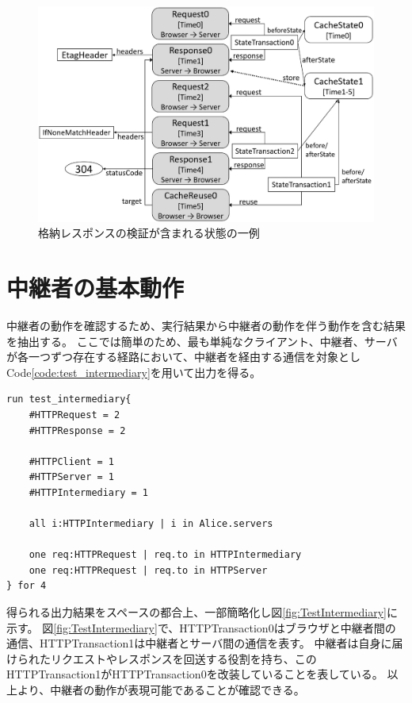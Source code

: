 \documentclass[12pt,a4paper]{jbook}
\begin{document}
\begin{figure}[htb]
\centering
\includegraphics[width=450pt]{./fig/TestVerification.eps}
\caption{格納レスポンスの検証が含まれる状態の一例}
\label{fig:TestVerification}
\end{figure}

\section{中継者の基本動作}
中継者の動作を確認するため、実行結果から中継者の動作を伴う動作を含む結果を抽出する。
ここでは簡単のため、最も単純なクライアント、中継者、サーバが各一つずつ存在する経路において、中継者を経由する通信を対象としCode\ref{code:test_intermediary}を用いて出力を得る。

\begin{lstlisting}[caption=中継者の動作, label=code:test_intermediary]
run test_intermediary{
	#HTTPRequest = 2
	#HTTPResponse = 2

	#HTTPClient = 1
	#HTTPServer = 1
	#HTTPIntermediary = 1

	all i:HTTPIntermediary | i in Alice.servers

	one req:HTTPRequest | req.to in HTTPIntermediary
	one req:HTTPRequest | req.to in HTTPServer
} for 4
\end{lstlisting}

得られる出力結果をスペースの都合上、一部簡略化し図\ref{fig:TestIntermediary}に示す。
図\ref{fig:TestIntermediary}で、HTTPTransaction0はブラウザと中継者間の通信、HTTPTransaction1は中継者とサーバ間の通信を表す。
中継者は自身に届けられたリクエストやレスポンスを回送する役割を持ち、このHTTPTransaction1がHTTPTransaction0を改装していることを表している。
以上より、中継者の動作が表現可能であることが確認できる。
\end{document}
